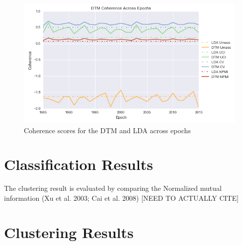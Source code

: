 \begin{figure}[!htb]
\centering
\includegraphics[width=130mm,scale=0.45]{Figures/DTMCoherences}
\decoRule
\caption[EpochCoherences]{Coherence scores for the DTM and LDA across epochs}
\label{fig:EpochCoherences}
\end{figure}


\section{Classification Results}

The clustering result is evaluated by comparing the Normalized mutual information (Xu et al. 2003; Cai et al. 2008) [NEED TO ACTUALLY CITE]

\section{Clustering Results}

